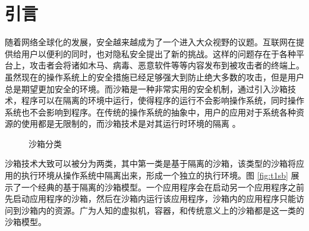 \documentclass[preprint,12pt]{elsarticle}
\begin{document}

\section{引言}
\label{s:introduction}

随着网络全球化的发展，安全越来越成为了一个进入大众视野的议题。互联网在提供给用户以便利的同时，也对隐私安全提出了新的挑战。这样的问题存在于各种平台上，攻击者会将诸如木马、病毒、恶意软件等等内容发布到被攻击者的终端上。\cite{miwa} 虽然现在的操作系统上的安全措施已经足够强大到防止绝大多数的攻击，但是用户总是期望更加安全的环境。而沙箱是一种非常实用的安全机制，通过引入沙箱技术，程序可以在隔离的环境中运行，使得程序的运行不会影响操作系统，同时操作系统也不会影响到程序。在传统的操作系统的抽象中，用户的应用对于系统各种资源的使用都是无限制的，而沙箱技术是对其运行时环境的隔离 \cite{sandbox}。

\begin{figure}
\centering
{}
\caption{沙箱分类}
\end{figure}

沙箱技术大致可以被分为两类，其中第一类是基于隔离的沙箱，该类型的沙箱将应用的执行环境从操作系统中隔离出来，形成一个独立的执行环境。图 \ref{fig:t1sb} 展示了一个经典的基于隔离的沙箱模型。一个应用程序会在启动另一个应用程序之前先启动应用程序的沙箱，然后在沙箱内运行该应用程序，沙箱内的应用程序只能访问到沙箱内的资源。广为人知的虚拟机，容器，和传统意义上的沙箱都是这一类的沙箱模型。
\end{document}
